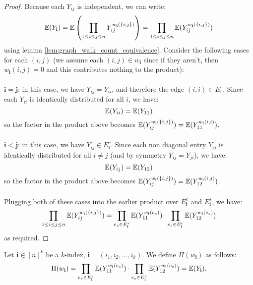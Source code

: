 \begin{proof}
  Because each $Y_{ij}$ is independent, we can write:
  $$
  \mathbb{E}(Y_{\mathbf{i}}) = \mathbb{E}\left(\prod_{1 \leq i \leq j \leq n} Y_{ij}^{w_{\mathbf{i}}(\{i, j\})}\right)
  = \prod_{1 \leq i \leq j \leq n} \mathbb{E}(Y_{ij}^{w_{\mathbf{i}}(\{i, j\})})
  $$
  using lemma \ref{lem:graph_walk_count_equivalence}. Consider the following cases for each $(i, j)$ (we assume each $(i, j) \in w_{\mathbf{i}}$ since if they aren't, then $w_{\mathbf{i}}(i, j) = 0$ and this contributes nothing to the product):\\\\
  $\mathbf{i = j}$: in this case, we have $Y_{ij} = Y_{ii}$, and therefore the edge $(i, i) \in E_{\mathbf{i}}^{s}$. Since each $Y_{ii}$ is identically distributed for all $i$, we have:
  $$
  \mathbb{E}(Y_{ii}) = \mathbb{E}(Y_{11})
  $$
  so the factor in the product above becomes $\mathbb{E}(Y_{ij}^{w_{\mathbf{i}}(\{i, j\})}) = \mathbb{E}(Y_{11}^{w_{\mathbf{i}}(i, i)})$.\\\\
  $\mathbf{i < j}$: in this case, we have  $Y_{ij} \in E_{\mathbf{i}}^{c}$. Since each non diagonal entry $Y_{ij}$ is identically distributed for all $i \neq j$ (and by symmetry $Y_{ij} = Y_{ji}$), we have:
  $$
  \mathbb{E}(Y_{ij}) = \mathbb{E}(Y_{12})
  $$
  so the factor in the product above becomes $\mathbb{E}(Y_{ij}^{w_{\mathbf{i}}(\{i, j\})}) = \mathbb{E}(Y_{12}^{w_{\mathbf{i}}(i, j)})$.\\\\
  Plugging both of these cases into the earlier product over $E_{\mathbf{i}}^{c}$ and $E_{\mathbf{i}}^{s}$, we have:
  $$
  \prod_{1 \leq i \leq j \leq n} \mathbb{E}(Y_{ij}^{w_{\mathbf{i}}(\{i, j\})}) = \prod_{e_s \in E_{\mathbf{i}}^s} \mathbb{E}(Y_{11}^{w_{\mathbf{i}}(e_s)}) \cdot \prod_{e_c \in E_{\mathbf{i}}^c} \mathbb{E}(Y_{12}^{w_{\mathbf{i}}(e_c)})
  $$
  as required.
\end{proof}


\begin{definition}
    \label{def:prod_expectation_matrix_multi_index}
    Let $\mathbf{i} \in [n]^{k}$ be a $k$-index, $\mathbf{i} = (i_1, i_2, \ldots, i_{k})$. We define
    $\Pi(w_{\mathbf{i}})$ as follows:
    $$
    \Pi (w_{\mathbf{i}}) = \prod_{e_s \in E_{\mathbf{i}}^s} \mathbb{E}(Y_{11}^{w_{\mathbf{i}}(e_s)}) \cdot \prod_{e_c \in E_{\mathbf{i}}^c} \mathbb{E}(Y_{12}^{w_{\mathbf{i}}(e_c)}) = \mathbb{E}(Y_{\mathbf{i}}).
    $$
\end{definition}


